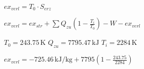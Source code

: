 \( ex_{verl} = T_0 \cdot S_{erz} \)  

\( ex_{verl} = ex_{str} + \sum Q_{zu} \left( 1 - \frac{T_i}{T_0} \right) - W - ex_{verl} \)  

\( T_0 = 243.75 \, \text{K} \)  
\( Q_{zu} = 7795.47 \, \text{kJ} \)  
\( T_i = 2284 \, \text{K} \)  

\( ex_{verl} = -725.46 \, \text{kJ/kg} + 7795 \left( 1 - \frac{243.75}{2284} \right) \)